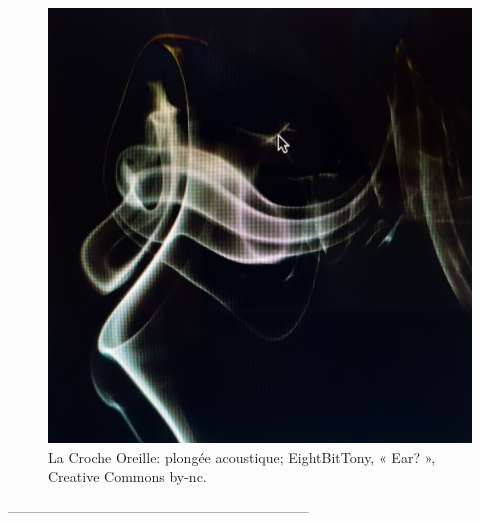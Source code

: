       \begin{figure}[tbh]
        \centering
        \includegraphics[width=1\linewidth]{images/oreillephoto.jpg}
        \caption{La Croche Oreille: plongée acoustique; EightBitTony, « Ear? », Creative Commons by-nc.}
        \label{fig}
      \end{figure}


-----------------------------------------------------------------













